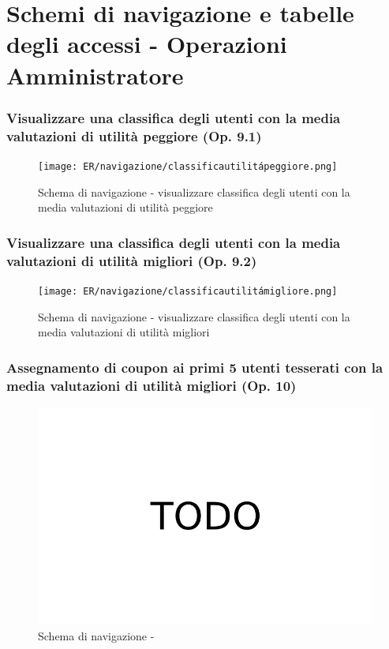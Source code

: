 \documentclass[a4paper,12pt]{report}
\begin{document}
\section{Schemi di navigazione e tabelle degli accessi - Operazioni Amministratore}
\subsubsection{Visualizzare una classifica degli utenti con la media valutazioni di utilità peggiore (Op. 9.1)}
\begin{figure}[H]
	\centering
	\texttt{[image: ER/navigazione/classificautilitápeggiore.png]}
	\caption{Schema di navigazione - visualizzare classifica degli utenti con la media valutazioni di utilità peggiore}
\end{figure}

\subsubsection{Visualizzare una classifica degli utenti con la media valutazioni di utilità migliori (Op. 9.2)}
\begin{figure}[H]
	\centering
	\texttt{[image: ER/navigazione/classificautilitámigliore.png]}
	\caption{Schema di navigazione - visualizzare classifica degli utenti con la media valutazioni di utilità migliori}
\end{figure}

\subsubsection{Assegnamento di coupon ai primi 5 utenti tesserati con la media valutazioni di utilità migliori (Op. 10)}
\begin{figure}[H]
	\centering
	\includegraphics[width=450pt]{ER/navigazione/couponutentimigliori.png}
	\caption{Schema di navigazione - }
\end{figure}
\end{document}
